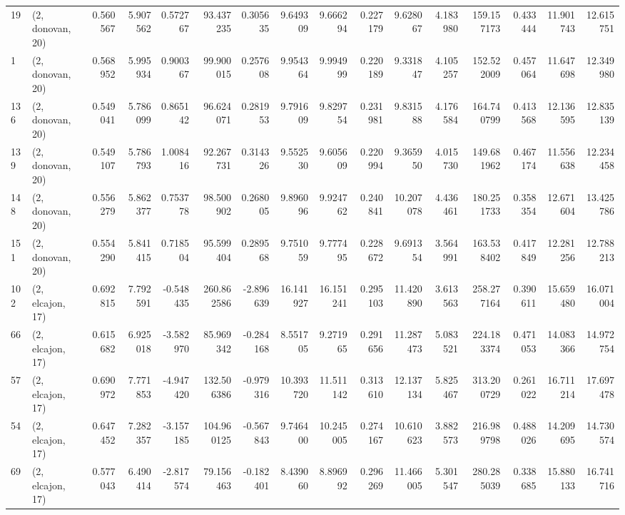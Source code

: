 \begin{tabular}{llrrrrrrrrrrrrrr}
19  &  (2, donovan, 20) &   0.560567 &   5.907562 &  0.572767 &   93.437235 &  0.305635 &   9.649309 &   9.666294 &  0.227179 &   9.628067 &   4.183980 &  159.157173 &  0.433444 &  11.901743 &  12.615751 \\
1   &  (2, donovan, 20) &   0.568952 &   5.995934 &  0.900367 &   99.900015 &  0.257608 &   9.954364 &   9.994999 &  0.220189 &   9.331847 &   4.105257 &  152.522009 &  0.457064 &  11.647698 &  12.349980 \\
136 &  (2, donovan, 20) &   0.549041 &   5.786099 &  0.865142 &   96.624071 &  0.281953 &   9.791609 &   9.829754 &  0.231981 &   9.831588 &   4.176584 &  164.740799 &  0.413568 &  12.136595 &  12.835139 \\
139 &  (2, donovan, 20) &   0.549107 &   5.786793 &  1.008416 &   92.267731 &  0.314326 &   9.552530 &   9.605609 &  0.220994 &   9.365950 &   4.015730 &  149.681962 &  0.467174 &  11.556638 &  12.234458 \\
148 &  (2, donovan, 20) &   0.556279 &   5.862377 &  0.753778 &   98.500902 &  0.268005 &   9.896096 &   9.924762 &  0.240841 &  10.207078 &   4.436461 &  180.251733 &  0.358354 &  12.671604 &  13.425786 \\
151 &  (2, donovan, 20) &   0.554290 &   5.841415 &  0.718504 &   95.599404 &  0.289568 &   9.751059 &   9.777495 &  0.228672 &   9.691354 &   3.564991 &  163.538402 &  0.417849 &  12.281256 &  12.788213 \\
102 &  (2, elcajon, 17) &   0.692815 &   7.792591 & -0.548435 &  260.862586 & -2.896639 &  16.141927 &  16.151241 &  0.295103 &  11.420890 &   3.613563 &  258.277164 &  0.390611 &  15.659480 &  16.071004 \\
66  &  (2, elcajon, 17) &   0.615682 &   6.925018 & -3.582970 &   85.969342 & -0.284168 &   8.551705 &   9.271965 &  0.291656 &  11.287473 &   5.083521 &  224.183374 &  0.471053 &  14.083366 &  14.972754 \\
57  &  (2, elcajon, 17) &   0.690972 &   7.771853 & -4.947420 &  132.506386 & -0.979316 &  10.393720 &  11.511142 &  0.313610 &  12.137134 &   5.825467 &  313.200729 &  0.261022 &  16.711214 &  17.697478 \\
54  &  (2, elcajon, 17) &   0.647452 &   7.282357 & -3.157185 &  104.960125 & -0.567843 &   9.746400 &  10.245005 &  0.274167 &  10.610623 &   3.882573 &  216.989798 &  0.488026 &  14.209695 &  14.730574 \\
69  &  (2, elcajon, 17) &   0.577043 &   6.490414 & -2.817574 &   79.156463 & -0.182401 &   8.439060 &   8.896992 &  0.296269 &  11.466005 &   5.301547 &  280.285039 &  0.338685 &  15.880133 &  16.741716 \\

\end{tabular}
